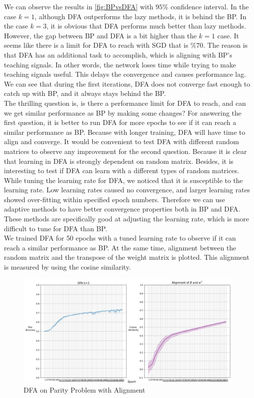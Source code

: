 \documentclass[a4paper, nobind]{templates/ociamthesis}
\begin{document}
\noindent We can observe the results in \ref{fig:BPvsDFA} with \(95\%\) confidence interval. In the case \(k=1\), although DFA outperforms the lazy methods, it is behind the BP. In the case \(k=3\), it is obvious that DFA performs much better than lazy methods. However, the gap between BP and DFA is a bit higher than the \(k=1\) case. It seems like there is a limit for DFA to reach with SGD that is \(\%70\). The reason is that DFA has an additional task to accomplish, which is aligning with BP's teaching signals. In other words, the network loses time while trying to make teaching signals useful. This delays the convergence and causes performance lag. We can see that during the first iterations, DFA does not converge fast enough to catch up with BP, and it always stays behind the BP.\\
The thrilling question is, is there a performance limit for DFA to reach, and can we get similar performance as BP by making some changes? For answering the first question, it is better to run DFA for more epochs to see if it can reach a similar performance as BP. Because with longer training, DFA will have time to align and converge. It would be convenient to test DFA with different random matrices to observe any improvement for the second question. Because it is clear that learning in DFA is strongly dependent on random matrix. Besides, it is interesting to test if DFA can learn with a different types of random matrices. While tuning the learning rate for DFA, we noticed that it is susceptible to the learning rate. Low learning rates caused no convergence, and larger learning rates showed over-fitting within specified epoch numbers. Therefore we can use adaptive methods to have better convergence properties both in BP and DFA. These methods are specifically good at adjusting the learning rate, which is more difficult to tune for DFA than BP.\\
\noindent We trained DFA for 50 epochs with a tuned learning rate to observe if it can reach a similar performance as BP. At the same time, alignment between the random matrix and the transpose of the weight matrix is plotted. This alignment is measured by using the cosine similarity.

\begin{figure}

{\centering \includegraphics[width=1\linewidth]{figures/3_k3_SGD_DFA_Alingment} 

}

\caption{DFA on Parity Problem with Alignment}\label{fig:DFA50epochs}
\end{figure}
\end{document}

